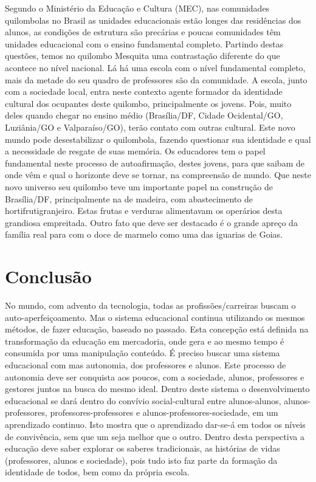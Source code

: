 \hspace{1.5cm}
Segundo o Ministério da Educação e Cultura (MEC), nas comunidades quilombolas no Brasil as unidades educacionais estão longes das residências dos alunos, as condições de estrutura são precárias e poucas comunidades têm unidades educacional com o ensino fundamental completo. Partindo destas questões, temos no quilombo Mesquita uma contrastação diferente do que acontece no nível nacional. Lá há uma escola com o nível fundamental completo, mais da metade do seu quadro de professores são da comunidade. A escola, junto com a sociedade local, entra neste contexto agente formador da identidade cultural dos ocupantes deste quilombo, principalmente os jovens. Pois, muito deles quando chegar no ensino médio (Brasília/DF, Cidade Ocidental/GO, Luziânia/GO e Valparaíso/GO), terão contato com outras cultural. Este novo mundo pode desestabilizar o quilombola, fazendo questionar sua identidade e qual a necessidade de resgate de suas memória. Os educadores tem o papel fundamental neste processo de autoafirmação, destes jovens, para que saibam de onde vêm e qual o horizonte deve se tornar, na compreensão de mundo. Que neste novo universo seu quilombo teve um importante papel na construção de Brasília/DF, principalmente na de madeira, com abastecimento de hortifrutigranjeiro. Estas frutas e verduras alimentavam os operários desta grandiosa empreitada. Outro fato que deve ser destacado é o grande apreço da família real para com o doce de marmelo como uma das iguarias de Goias.\\
\section*{Conclusão}
\hspace{1.5cm}
No mundo, com advento da tecnologia, todas as profissões/carreiras buscam o auto-aperfeiçoamento. Mas o sistema educacional continua utilizando os mesmos métodos, de fazer educação, baseado no passado. 
Esta concepção está definida na transformação da educação em mercadoria, onde gera e ao mesmo tempo é consumida por uma manipulação conteúdo. É preciso buscar uma sistema educacional com mas autonomia, dos professores e alunos. Este processo de autonomia deve ser conquista aos poucos, com a sociedade, alunos, professores e gestores juntos na busca do mesmo ideal. Dentro deste sistema o desenvolvimento educacional se dará dentro do convívio social-cultural entre alunos-alunos, alunos-professores, professores-professores e alunos-professores-sociedade, em um aprendizado continuo. Isto mostra que o aprendizado dar-se-á em todos os níveis de convivência,  sem que um seja melhor que o outro. Dentro desta perspectiva a educação deve saber explorar os saberes tradicionais, as histórias de vidas (professores, alunos e sociedade), pois tudo isto faz parte da formação da identidade de todos, bem como da própria escola. 